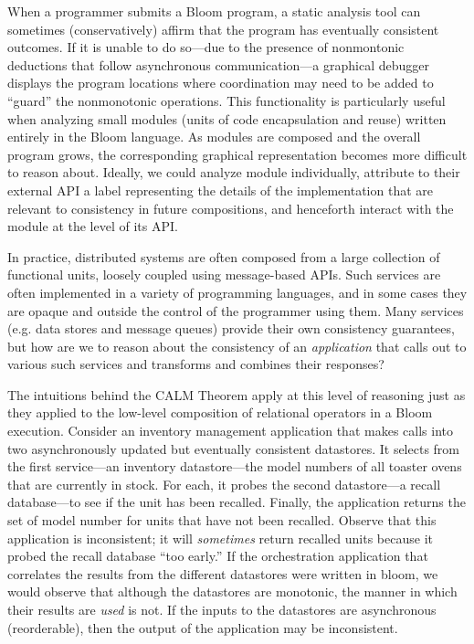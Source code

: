 When a programmer submits a Bloom program, a static analysis tool can sometimes
(conservatively) affirm that the program has eventually consistent outcomes.
If it is unable to do so---due to the presence of nonmontonic deductions
that follow asynchronous communication---a graphical debugger displays the
program locations where coordination may need to be added to ``guard'' the
nonmonotonic operations.  This functionality is particularly useful when
analyzing small modules (units of code encapsulation and reuse) written 
entirely in the Bloom language.
As modules are composed and the overall program grows, the corresponding graphical representation becomes more difficult to reason about.  Ideally,
we could analyze module individually, attribute to their external API a
label representing the details of the implementation that are relevant to
consistency in future compositions, and henceforth interact with the module at
the level of its API.  

In practice, distributed systems are often composed from a large 
collection of functional units, loosely coupled using message-based APIs.
Such services are often implemented in a variety of programming 
languages, and in some cases they are opaque and outside the control of
the programmer using them.  
Many services (e.g. data stores and message queues) provide their own 
consistency guarantees, but how are we to reason about the consistency of an
\emph{application} that calls out to various such services and transforms
and combines their responses?  

The intuitions behind the CALM Theorem apply at this level of reasoning
just as they applied to the low-level composition of relational operators
in a Bloom execution.  Consider an inventory management application 
that makes calls into two asynchronously updated but
eventually consistent datastores.  It selects from the first service---an 
inventory datastore---the model numbers of all toaster ovens that are currently in stock.  For each, it probes the second datastore---a recall database---to
see if the unit has been recalled.  Finally, the application returns the 
set of model number for units that have not been recalled.  Observe that this
application is inconsistent; it will \emph{sometimes} return recalled units 
because it probed the recall database ``too early.''  If the orchestration
application that correlates the results from the different datastores were written in bloom, we would observe that although the datastores are monotonic, 
the manner in which their results are \emph{used} is not.  If the inputs to 
the datastores are asynchronous (reorderable), then the output of the 
application may be inconsistent.


